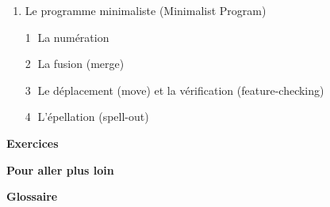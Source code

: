 \begin{keybox}
\begin{enumerate}[label=\arabic*.]
\textcircled{\scriptsize 2} La Théorie des Barrières (subjacency theory)\par\hspace*{1em}1. Le mouvement Qu (WH-movement)\par\hspace*{1em}2. Sous-jacence et îlots syntaxiques (Wh islands)\par
\textcircled{\scriptsize 3} P-structure et S-structure\par\textcircled{\scriptsize 4} Modules intentionnel-conceptuel et sensori-moteur
\item Le programme minimaliste (Minimalist Program)\par
\textcircled{\scriptsize 1} La numération\par\textcircled{\scriptsize 2} La fusion (merge)\par\textcircled{\scriptsize 3} Le déplacement (move) et la vérification (feature-checking)\par\textcircled{\scriptsize 4} L’épellation (spell-out)
\end{enumerate}
\textbf{Exercices}\par\textbf{Pour aller plus loin}\par\textbf{Glossaire}
\end{keybox}

